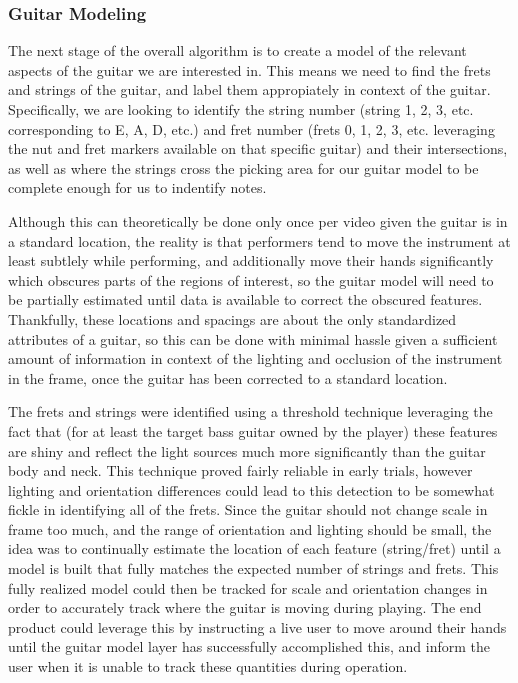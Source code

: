 \subsubsection{Guitar Modeling}
The next stage of the overall algorithm is to create a model of the relevant aspects of the guitar we are interested in.
This means we need to find the frets and strings of the guitar, and label them appropiately in context of the guitar.
Specifically, we are looking to identify the string number (string 1, 2, 3, etc. corresponding to E, A, D, etc.)
and fret number (frets 0, 1, 2, 3, etc. leveraging the nut and fret markers available on that specific guitar) and
their intersections, as well as where the strings cross the picking area for our guitar model to be complete enough
for us to indentify notes.
\par
Although this can theoretically be done only once per video given the guitar is in a standard location, 
the reality is that performers tend to move the instrument at least subtlely while performing,
and additionally move their hands significantly which obscures parts of the regions of interest,
so the guitar model will need to be partially estimated until data is available to correct the obscured features.
Thankfully, these locations and spacings are about the only standardized attributes of a guitar,
so this can be done with minimal hassle given a sufficient amount of information in context of the lighting
and occlusion of the instrument in the frame, once the guitar has been corrected to a standard location.
\par
The frets and strings were identified using a threshold technique leveraging the fact that
(for at least the target bass guitar owned by the player) these features are shiny and reflect
the light sources much more significantly than the guitar body and neck.
This technique proved fairly reliable in early trials, however lighting and orientation
differences could lead to this detection to be somewhat fickle in identifying all of the frets.
Since the guitar should not change scale in frame too much, and the range of orientation
and lighting should be small, the idea was to continually estimate the location of each feature
(string/fret) until a model is built that fully matches the expected number of strings and frets.
This fully realized model could then be tracked for scale and orientation changes in order to
accurately track where the guitar is moving during playing.
The end product could leverage this by instructing a live user to move around their hands until
the guitar model layer has successfully accomplished this, and inform the user when it is unable
to track these quantities during operation.

